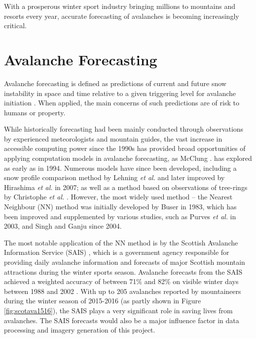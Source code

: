 \documentclass[openany]{UoYCSproject}
\begin{document}
With a prosperous winter sport industry bringing millions to mountains and resorts every year\cite{hudson2003sport}, accurate forecasting of avalanches is becoming increasingly critical. 

\section{Avalanche Forecasting}

Avalanche forecasting is defined as predictions of current and future snow instability in space and time relative to a given triggering level for avalanche initiation \cite[p. 131]{McClung2002}. When applied, the main concerns of such predictions are of risk to humans or property. 

While historically forecasting had been mainly conducted through observations by experienced meteorologists and mountain guides, the vast increase in accessible computing power since the 1990s has provided broad opportunities of applying computation models in avalanche forecasting, as McClung \cite{McClung1994}. has explored as early as in 1994. Numerous models have since been developed, including a snow profile comparison method by Lehning \textit{et al.} \cite{Lehning2001253} and later improved by Hirashima \textit{et al.} in 2007; as well as a method based on observations of tree-rings by Christophe \textit{et al.} \cite{Christophe2010107}. However, the most widely used method -- the Nearest Neighbour (NN) method was initially developed by Buser \cite{buser1983avalanche} in 1983, which has been improved and supplemented by various studies, such as Purves \textit{et al.} in 2003, and Singh and Ganju \cite{Singh2004105} \cite{Singh201533} since 2004.

The most notable application of the NN method is by the Scottish Avalanche Information Service (SAIS) \cite{sais}, which is a government agency responsible for providing daily avalanche information and forecasts of major Scottish mountain attractions during the winter sports season. Avalanche forecasts from the SAIS achieved a weighted accuracy of between 71\% and 82\% on visible winter days between 1988 and 2002 \cite[p. 351] {Purves2003343}. With up to 205 avalanches reported by mountaineers during the winter season of 2015-2016 \cite{sais} (as partly shown in Figure \ref{fig:scotava1516}), the SAIS plays a very significant role in saving lives from avalanches. The SAIS forecasts would also be a major influence factor in data processing and imagery generation of this project.
\end{document}
